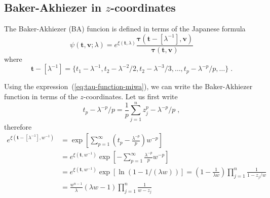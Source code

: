 \documentclass[a4paper,12pt]{amsart}
\begin{document}
\subsection{Baker-Akhiezer  in \(z\)-coordinates}

The Baker-Akhiezer (BA) funcion is defined in terms of the Japanese formula~\cite{Zabrodin2018}
\begin{equation}
  \psi(\bm{t},\bm{v}; \lambda) = e^{\xi(\bm{t}, \lambda)}
  \frac{\bm{\tau}(\bm{t} - [\lambda^{-1}], \bm{v})}{\bm{\tau}(\bm{t}, \bm{v})}
\end{equation}
where 
\begin{equation}
  \bm{t} - [\lambda^{-1}] = 
  \{t_1 - \lambda^{-1}, t_2 - \lambda^{-2}/ 2 ,  t_2 - \lambda^{-3}/3, \dots,  t_p - \lambda^{-p}/p, \dots \}\; .
\end{equation}

Using the expression~(\ref{eq:tau-function-miwa}), we can write the
Baker-Akhiezer function in terms of the \(z\)-coordinates.
Let us first write
\begin{equation}
  t_p - \lambda^{-p}/p = \frac{1}{p} \sum_{j=1}^n z_j^ p - \lambda^{-p}/p \; , 
\end{equation}
therefore
\begin{equation}
  \begin{split}
    e^{\xi(\bm{t} - [\lambda^{-1}], w^{-1})} & = \exp\left[ \sum_{p=1}^\infty \left(t_p  - \frac{\lambda^{-p}}{p}\right) w^{-p} \right]\\
    & = e^{\xi(\bm{t}, w^{-1})} \exp\left[ - \sum_{p=1}^\infty \frac{\lambda^{-p}}{p} w^{-p} \right] \\
    & = e^{\xi(\bm{t}, w^{-1})} \exp\left[ \ln ( 1 - 1 / (\lambda w)) \right]
      = \left( 1 - \frac{1}{\lambda w}\right)  \prod_{j=1}^n \frac{1}{1 -  z_j /w} \\
    & = \frac{w^{n-1}}{\lambda } \left( \lambda w - 1 \right)  \prod_{j=1}^n \frac{1}{w -  z_j} \\
  \end{split}
\end{equation}
\end{document}
